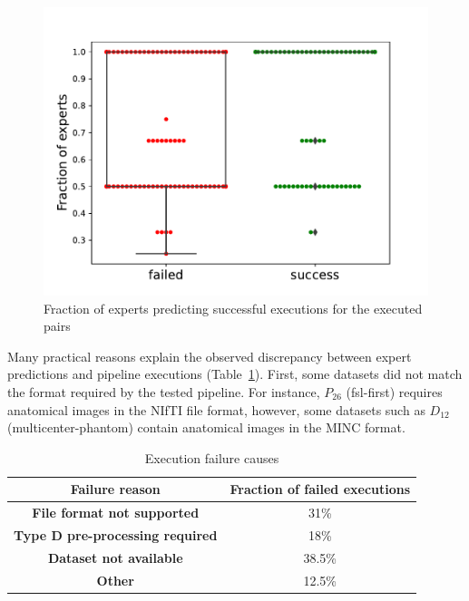 \documentclass[conference]{IEEEtran}
\begin{document}
\begin{figure}
  \includegraphics[width=\columnwidth]{figures/Fraction of experts.pdf}
  \caption{ Fraction of experts predicting successful executions for the executed pairs}
  \label{fig:fraction_experts}
\end{figure}





Many practical reasons explain the observed discrepancy between expert
predictions and pipeline executions (Table~\ref{tab1}). First, some
datasets did not match the format required by the tested pipeline. For
instance, $P_{26}$ (fsl-first) requires anatomical images in the NIfTI file
format, however, some datasets such as $D_{12}$ (multicenter-phantom)
contain anatomical images in the MINC format.

\begin{table}[htbp]
    \caption{Execution failure causes}
    \begin{center}
        \begin{tabular}{cc}
            \hline
            \textbf{Failure reason} & \textbf{Fraction of failed executions}  \\
            \hline
            \textbf{File format not supported}    & 31\% \\
            \textbf{Type D pre-processing required}    & 18\% \\
            \textbf{Dataset not available}         & 38.5\% \\
            \textbf{Other}       & 12.5\% \\
            \hline
        \end{tabular}
        \label{tab1}
    \end{center}
\end{table}
\end{document}
